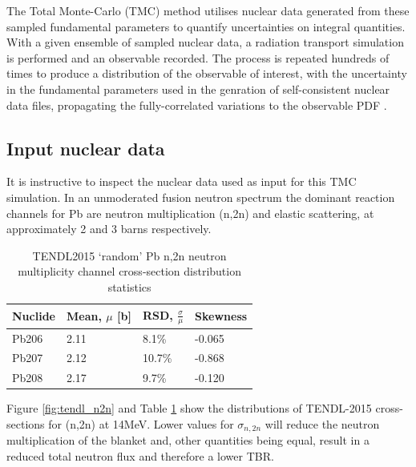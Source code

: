 The Total Monte-Carlo (TMC) method utilises nuclear data generated from these sampled fundamental parameters to quantify uncertainties on integral quantities. With a given ensemble of sampled nuclear data, a radiation transport simulation is performed and an observable recorded. The process is repeated hundreds of times to produce a distribution of the observable of interest, with the uncertainty in the fundamental parameters used in the genration of self-consistent nuclear data files, propagating the fully-correlated variations to the observable PDF \cite{Koning2008}.

\subsection{Input nuclear data}
\label{sec:data}
It is instructive to inspect the nuclear data used as input for this TMC simulation. In an unmoderated fusion neutron spectrum the dominant reaction channels for Pb are neutron multiplication (n,2n) and elastic scattering, at approximately 2 and 3 barns respectively.

\begin{table}[ht]
  \footnotesize
  \centering 
  \begin{tabular}{llll}
    \toprule
    Nuclide & Mean, $\mu$ [b] & RSD, $\frac{\sigma}{\mu}$ & Skewness \\
    \midrule
    Pb206 & 2.11 & 8.1\% & -0.065 \\
    Pb207 & 2.12 & 10.7\% & -0.868 \\
    Pb208 & 2.17 & 9.7\% & -0.120 \\
    \bottomrule
  \end{tabular}
  \caption{TENDL2015 `random' Pb n,2n neutron multiplicity channel cross-section distribution statistics}
  \label{table:n2n} %
\end{table}

Figure \ref{fig:tendl_n2n} and Table \ref{table:n2n} show the distributions of TENDL-2015 cross-sections for (n,2n) at 14MeV. Lower values for $\sigma_{n,2n}$ will reduce the neutron multiplication of the blanket and, other quantities being equal, result in a reduced total neutron flux and therefore a lower TBR.

